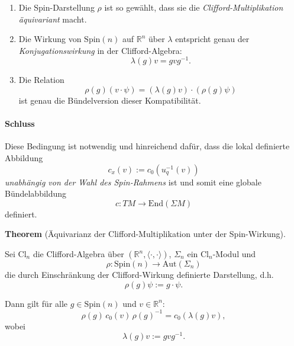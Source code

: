 \documentclass[10pt, letterpaper]{article}
\newcommand{\R}{\mathbb{R}}
\newcommand{\Aut}{\mathrm{Aut}}
\newcommand{\End}{\mathrm{End}}
\newcommand{\Cl}{\mathrm{Cl}}
\newcommand{\Spin}{\mathrm{Spin}}
\newcommand{\CustomHeading}[3]{%
  \par\medskip\noindent%
  \textbf{#1 #2} \textnormal{(#3)}.\enskip%
}
\newenvironment{THEO}[2]{\CustomHeading{Theorem}{#1}{#2}}{}
\begin{document}
\begin{enumerate}
\item Die Spin-Darstellung $\rho$ ist so gewählt, dass sie die
\emph{Clifford-Multiplikation äquivariant} macht.
\item Die Wirkung von $\Spin(n)$ auf $\R^n$ über $\lambda$ entspricht genau der
\emph{Konjugationswirkung} in der Clifford-Algebra:
\[
\lambda(g)v = g v g^{-1}.
\]
\item Die Relation
\[
\rho(g)(v\cdot \psi)
=
(\lambda(g)v)\cdot (\rho(g)\psi)
\]
ist genau die Bündelversion dieser Kompatibilität.
\end{enumerate}

\paragraph{Schluss}

Diese Bedingung ist notwendig und hinreichend dafür, dass die lokal definierte Abbildung
\[
c_x(v):=c_0(u_q^{-1}(v))
\]
\emph{unabhängig von der Wahl des Spin-Rahmens} ist und somit eine globale Bündelabbildung
\[
c:TM\to \End(\Sigma M)
\]
definiert.


\pagebreak

\begin{THEO}{}{Äquivarianz der Clifford-Multiplikation unter der Spin-Wirkung}
Sei $\Cl_n$ die Clifford-Algebra über $(\R^n,\langle\cdot,\cdot\rangle)$,
$\Sigma_n$ ein $\Cl_n$-Modul und
\[
\rho:\Spin(n)\to \Aut(\Sigma_n)
\]
die durch Einschränkung der Clifford-Wirkung definierte Darstellung,
d.h.
\[
\rho(g)\psi := g\cdot \psi.
\]

Dann gilt für alle $g\in \Spin(n)$ und $v\in \R^n$:
\[
\rho(g)\,c_0(v)\,\rho(g)^{-1}
=
c_0(\lambda(g)v),
\]
wobei
\[
\lambda(g)v := g v g^{-1}.
\]
\end{THEO}
\end{document}
